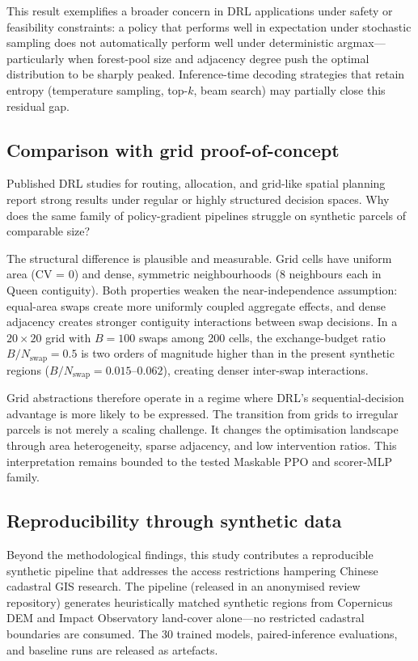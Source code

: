 \documentclass[]{interact}
\theoremstyle{plain}
\begin{document}
This result exemplifies a broader concern in DRL applications under safety or feasibility constraints: a policy that performs well in expectation under stochastic sampling does not automatically perform well under deterministic argmax---particularly when forest-pool size and adjacency degree push the optimal distribution to be sharply peaked. Inference-time decoding strategies that retain entropy (temperature sampling, top-$k$, beam search) may partially close this residual gap.

\subsection{Comparison with grid proof-of-concept}\label{sec:disc-vs-grid}

Published DRL studies for routing, allocation, and grid-like spatial planning \citep{bello2017neural,nazari2018reinforcement,kool2019attention,zheng2023spatial} report strong results under regular or highly structured decision spaces. Why does the same family of policy-gradient pipelines struggle on synthetic parcels of comparable size?

The structural difference is plausible and measurable. Grid cells have uniform area (CV = 0) and dense, symmetric neighbourhoods (8 neighbours each in Queen contiguity). Both properties weaken the near-independence assumption: equal-area swaps create more uniformly coupled aggregate effects, and dense adjacency creates stronger contiguity interactions between swap decisions. In a $20{\times}20$ grid with $B = 100$ swaps among 200 cells, the exchange-budget ratio $B / N_{\text{swap}} = 0.5$ is two orders of magnitude higher than in the present synthetic regions ($B / N_{\text{swap}} = 0.015$--$0.062$), creating denser inter-swap interactions.

Grid abstractions therefore operate in a regime where DRL's sequential-decision advantage is more likely to be expressed. The transition from grids to irregular parcels is not merely a scaling challenge. It changes the optimisation landscape through area heterogeneity, sparse adjacency, and low intervention ratios. This interpretation remains bounded to the tested Maskable PPO and scorer-MLP family.

\subsection{Reproducibility through synthetic data}\label{sec:disc-repro}

Beyond the methodological findings, this study contributes a reproducible synthetic pipeline that addresses the access restrictions hampering Chinese cadastral GIS research. The pipeline (released in an anonymised review repository) generates heuristically matched synthetic regions from Copernicus DEM and Impact Observatory land-cover alone---no restricted cadastral boundaries are consumed. The 30 trained models, paired-inference evaluations, and baseline runs are released as artefacts.
\end{document}
